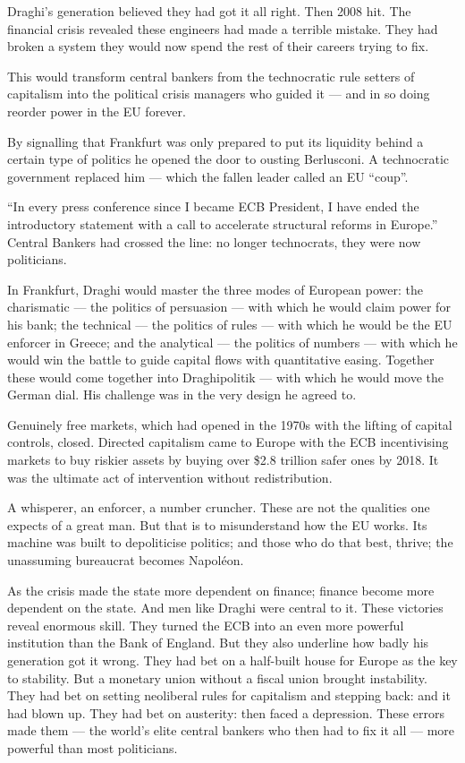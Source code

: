 \documentclass[
]{book}
\begin{document}
Draghi's generation believed they had got it all right. Then 2008 hit. The financial crisis revealed these engineers had made a terrible mistake. They had broken a system they would now spend the rest of their careers trying to fix.

This would transform central bankers from the technocratic rule setters of capitalism into the political crisis managers who guided it --- and in so doing reorder power in the EU forever.

By signalling that Frankfurt was only prepared to put its liquidity behind a certain type of politics he opened the door to ousting Berlusconi. A technocratic government replaced him --- which the fallen leader called an EU ``coup''.

``In every press conference since I became ECB President, I have ended the introductory statement with a call to accelerate structural reforms in Europe.'' Central Bankers had crossed the line: no longer technocrats, they were now politicians.

In Frankfurt, Draghi would master the three modes of European power: the charismatic --- the politics of persuasion --- with which he would claim power for his bank; the technical --- the politics of rules --- with which he would be the EU enforcer in Greece; and the analytical --- the politics of numbers --- with which he would win the battle to guide capital flows with quantitative easing. Together these would come together into Draghipolitik --- with which he would move the German dial. His challenge was in the very design he agreed to.

Genuinely free markets, which had opened in the 1970s with the lifting of capital controls, closed. Directed capitalism came to Europe with the ECB incentivising markets to buy riskier assets by buying over \$2.8 trillion safer ones by 2018. It was the ultimate act of intervention without redistribution.

A whisperer, an enforcer, a number cruncher. These are not the qualities one expects of a great man. But that is to misunderstand how the EU works. Its machine was built to depoliticise politics; and those who do that best, thrive; the unassuming bureaucrat becomes Napoléon.

As the crisis made the state more dependent on finance; finance become more dependent on the state.
And men like Draghi were central to it. These victories reveal enormous skill. They turned the ECB into an even more powerful institution than the Bank of England. But they also underline how badly his generation got it wrong. They had bet on a half-built house for Europe as the key to stability. But a monetary union without a fiscal union brought instability. They had bet on setting neoliberal rules for capitalism and stepping back: and it had blown up. They had bet on austerity: then faced a depression. These errors made them --- the world's elite central bankers who then had to fix it all --- more powerful than most politicians.
\end{document}
